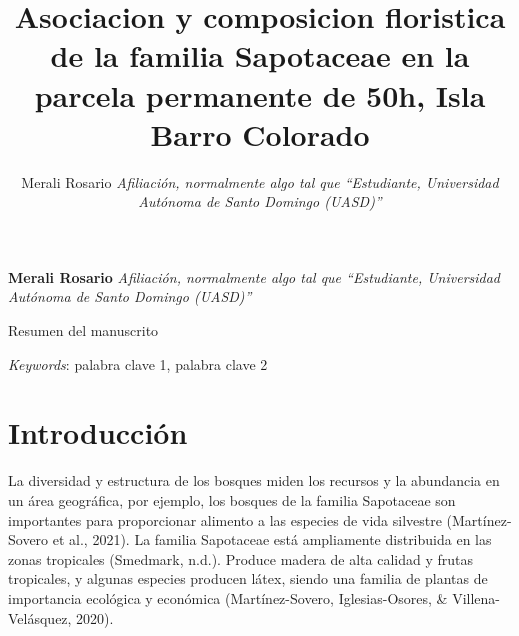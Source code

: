 \documentclass[11pt,]{article}
\title{Asociacion y composicion floristica de la familia Sapotaceae en la
parcela permanente de 50h, Isla Barro Colorado  }
\author{\Large Merali Rosario\vspace{0.05in} \newline\normalsize\emph{Afiliación, normalmente algo tal que ``Estudiante, Universidad Autónoma
de Santo Domingo (UASD)''}  }
\date{}
\newcommand*{\authorfont}{\fontfamily{phv}\selectfont}
\renewenvironment{abstract}
 {{%
    \setlength{\leftmargin}{0mm}
    \setlength{\rightmargin}{\leftmargin}%
  }%
  \relax}
 {\endlist}
\begin{document}
	
%

{%
\setlength{\parindent}{0pt}
\thispagestyle{plain}
{\fontsize{18}{20}\selectfont\raggedright 
\maketitle  %

}

{
   \vskip 13.5pt\relax \normalsize\fontsize{11}{12} 
\textbf{\authorfont Merali Rosario} \hskip 15pt \emph{\small Afiliación, normalmente algo tal que ``Estudiante, Universidad Autónoma
de Santo Domingo (UASD)''}   

}

}








\begin{abstract}

    \hbox{\vrule height .2pt width 39.14pc}

    \vskip 8.5pt %

\noindent Resumen del manuscrito


\vskip 8.5pt \noindent \emph{Keywords}: palabra clave 1, palabra clave 2 \par

    \hbox{\vrule height .2pt width 39.14pc}



\end{abstract}


\vskip 6.5pt


\noindent  \section{Introducción}\label{introducciuxf3n}

La diversidad y estructura de los bosques miden los recursos y la
abundancia en un área geográfica, por ejemplo, los bosques de la familia
Sapotaceae son importantes para proporcionar alimento a las especies de
vida silvestre (Martínez-Sovero et al., 2021). La familia Sapotaceae
está ampliamente distribuida en las zonas tropicales (Smedmark, n.d.).
Produce madera de alta calidad y frutas tropicales, y algunas especies
producen látex, siendo una familia de plantas de importancia ecológica y
económica (Martínez-Sovero, Iglesias-Osores, \& Villena-Velásquez,
2020).
\end{document}
